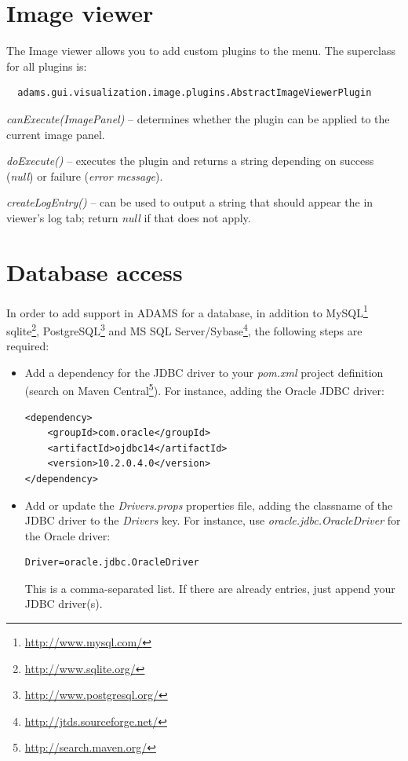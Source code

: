 \section{Image viewer}
The Image viewer allows you to add custom plugins to the menu. The superclass
for all plugins is:
\begin{verbatim}
  adams.gui.visualization.image.plugins.AbstractImageViewerPlugin
\end{verbatim}
\begin{tight_itemize}
  \item \textit{canExecute(ImagePanel)} -- determines whether the plugin can
  be applied to the current image panel.
  \item \textit{doExecute()} -- executes the plugin and returns a string
  depending on success (\textit{null}) or failure (\textit{error message}).
  \item \textit{createLogEntry()} -- can be used to output a string that 
  should appear the in viewer's log tab; return \textit{null} if that does
  not apply.
\end{tight_itemize}

\section{Database access}
In order to add support in ADAMS for a database, in addition to MySQL\footnote{\url{http://www.mysql.com/}{}} 
sqlite\footnote{\url{http://www.sqlite.org/}{}}, PostgreSQL\footnote{\url{http://www.postgresql.org/}{}}
and MS SQL Server/Sybase\footnote{\url{http://jtds.sourceforge.net/}{}}, the following steps are required:
\begin{itemize}
	\item Add a dependency for the JDBC driver to your \textit{pom.xml} project
	definition (search on Maven Central\footnote{\url{http://search.maven.org/}{}}). 
	For instance, adding the Oracle JDBC driver: \\
\begin{verbatim}
<dependency>
    <groupId>com.oracle</groupId>
    <artifactId>ojdbc14</artifactId>
    <version>10.2.0.4.0</version>
</dependency>
\end{verbatim}
	\item Add or update the \textit{Drivers.props} properties file, adding
	the classname of the JDBC driver to the \textit{Drivers} key. For instance,
	use \textit{oracle.jdbc.OracleDriver} for the Oracle driver: \\
\begin{verbatim}
Driver=oracle.jdbc.OracleDriver
\end{verbatim}
	This is a comma-separated list. If there are already entries, just append
	your JDBC driver(s).
\end{itemize}

